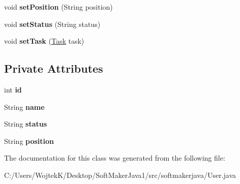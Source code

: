 \begin{DoxyCompactItemize}
\item 
void {\bfseries set\+Position} (String position)\hypertarget{classsoftmakerjava_1_1_user_ad29eab622ffef70d52305b7351db28ce}{}\label{classsoftmakerjava_1_1_user_ad29eab622ffef70d52305b7351db28ce}

\item 
void {\bfseries set\+Status} (String status)\hypertarget{classsoftmakerjava_1_1_user_a95c4fa67e8714f0a444c837c3d6f4cd4}{}\label{classsoftmakerjava_1_1_user_a95c4fa67e8714f0a444c837c3d6f4cd4}

\item 
void {\bfseries set\+Task} (\hyperlink{classsoftmakerjava_1_1_task}{Task} task)\hypertarget{classsoftmakerjava_1_1_user_a9c5b2a2f11a37caeff61e462506c1728}{}\label{classsoftmakerjava_1_1_user_a9c5b2a2f11a37caeff61e462506c1728}

\end{DoxyCompactItemize}
\subsection*{Private Attributes}
\begin{DoxyCompactItemize}
\item 
int {\bfseries id}\hypertarget{classsoftmakerjava_1_1_user_a4ce23be841fd125ad6629a5fe2102466}{}\label{classsoftmakerjava_1_1_user_a4ce23be841fd125ad6629a5fe2102466}

\item 
String {\bfseries name}\hypertarget{classsoftmakerjava_1_1_user_ad6ffdb13839bffb212c60a5e8dd29efd}{}\label{classsoftmakerjava_1_1_user_ad6ffdb13839bffb212c60a5e8dd29efd}

\item 
String {\bfseries status}\hypertarget{classsoftmakerjava_1_1_user_a1e1c95a7f54b640c72cbe2dc3b83d182}{}\label{classsoftmakerjava_1_1_user_a1e1c95a7f54b640c72cbe2dc3b83d182}

\item 
String {\bfseries position}\hypertarget{classsoftmakerjava_1_1_user_a56188006e7443054457de5617d6dba62}{}\label{classsoftmakerjava_1_1_user_a56188006e7443054457de5617d6dba62}

\end{DoxyCompactItemize}


The documentation for this class was generated from the following file\+:\begin{DoxyCompactItemize}
\item 
C\+:/\+Users/\+Wojtek\+K/\+Desktop/\+Soft\+Maker\+Java1/src/softmakerjava/User.\+java\end{DoxyCompactItemize}
